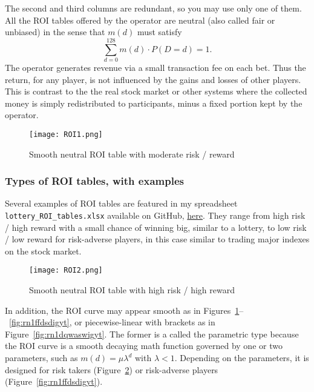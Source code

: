 \documentclass[oneside,10pt]{book}
\begin{document}
\noindent The second and third columns are redundant, so you may use only one of them. 
All the ROI tables offered by the operator are neutral (also called fair or unbiased) in the sense that $m(d)$ must satisfy
\begin{equation}
\sum_{d=0}^{128} m(d)\cdot P(D = d) = 1. \label{sapired}
\end{equation}
The operator generates revenue via a small transaction fee on each bet. Thus the return, for any player, is not influenced by the gains and losses of other players. This is contrast to the the real stock market or other systems where the collected money is simply redistributed
 to participants, minus a fixed portion kept by the operator.

\begin{figure}[H]
\centering
\texttt{[image: ROI1.png]}  
\caption{Smooth neutral ROI table with moderate risk / reward}
\label{fig:rn1diur44}
\end{figure}

\subsubsection{Types of ROI tables, with examples}

Several examples of ROI tables are featured in my spreadsheet \texttt{lottery\_ROI\_tables.xlsx} available on GitHub,
 \href{https://github.com/VincentGranville/Stochastic-Processes/blob/master/lottery_ROI_tables.xlsx}{here}.
 They range from high risk / high reward with a small chance of winning big, similar to a lottery, to low risk / low reward for risk-adverse players, in this case similar to trading major indexes on the stock market. 

\begin{figure}[H]
\centering
\texttt{[image: ROI2.png]}  
\caption{Smooth neutral ROI table with high risk / high reward}
\label{fig:rn1digygtf43t}
\end{figure}

 In addition, the ROI curve may appear smooth
 as in Figures~\ref{fig:rn1diur44}--~\ref{fig:rn1ffdsdigyt}, or piecewise-linear with brackets as in Figure~\ref{fig:rn1dqwaswigyt}.
 The former is a called the parametric type because the ROI curve is a smooth decaying math function governed by one 
 or two parameters, such as $m(d) = \mu \lambda^{d}$ with $\lambda<1$. Depending on the parameters, it is designed for risk takers (Figure~\ref{fig:rn1digygtf43t}) or risk-adverse
 players (Figure~\ref{fig:rn1ffdsdigyt}). 
\end{document}
